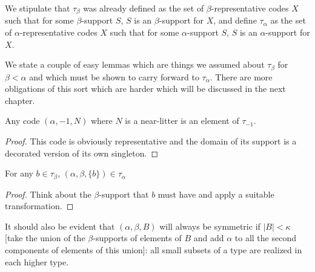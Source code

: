 \begin{definition}
\label {def:tau-alpha}



We stipulate that $\tau_\beta$ was already defined as the set of $\beta$-representative codes $X$ such that for some $\beta$-support $S$,
$S$ is an $\beta$-support for $X$,  and define $\tau_\alpha$ as the set of $\alpha$-representative codes $X$ such that for some $\alpha$-support $S$,
$S$ is an $\alpha$-support for $X$.

\end{definition}

We state a couple of easy lemmas which are things we assumed about $\tau_\beta$ for $\beta<\alpha$ and which must be shown to carry forward to $\tau_\alpha$.  There are more obligations of this sort which are harder which will be discussed in the next chapter.

\begin{lemma}

Any code $(\alpha,-1,N)$ where $N$ is a near-litter is an element of $\tau_{-1}$.

\end{lemma}

\begin{proof}

This code is obviously representative and the domain of its support is a decorated version of its own singleton.

\end{proof}

\begin{lemma}
\label {def:singleton-obligation}

For any $b \in \tau_\beta$, $(\alpha,\beta,\{b\}) \in \tau_\alpha$

\end{lemma}

\begin{proof}

Think about the $\beta$-support that $b$ must have and apply a suitable transformation.

\end{proof}

\begin{lemma}
\label {lem:small-subsets-closure}

It should also be evident that $(\alpha,\beta,B)$ will always be symmetric if $|B|<\kappa$ [take the union of the $\beta$-supports of elements of $B$ and add $\alpha$ to all the second components of elements of this union]:  all small subsets of a type are realized in each higher type.

\end{lemma}

